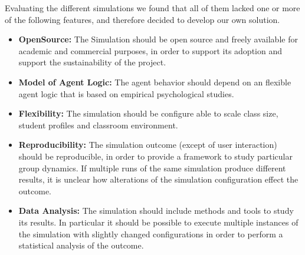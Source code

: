 \bb

Evaluating the different simulations we found that all of them lacked one or more
of the following features, and therefore decided to develop our own solution.

\begin{itemize}
    \item \textbf{OpenSource:} The Simulation should be open source and freely available
    for academic and commercial purposes, in order to support its adoption and support
    the sustainability of the project.
    \item \textbf{Model of Agent Logic:} The agent behavior should depend on an
    flexible agent logic that is based on empirical psychological studies.
    \item \textbf{Flexibility:} The simulation should be configure able to scale
    class size, student profiles and classroom environment.
    \item \textbf{Reproducibility:} The simulation outcome (except of user interaction) should
    be reproducible, in order to provide a framework to study particular group dynamics.
    If multiple runs of the same simulation produce different results, it is unclear
    how alterations of the simulation configuration effect the outcome.
    \item \textbf{Data Analysis:} The simulation should include methods and tools
    to study its results. In particular it should be possible to execute multiple
    instances of the simulation with slightly changed configurations in order to
    perform a statistical analysis of the outcome.
\end{itemize}
